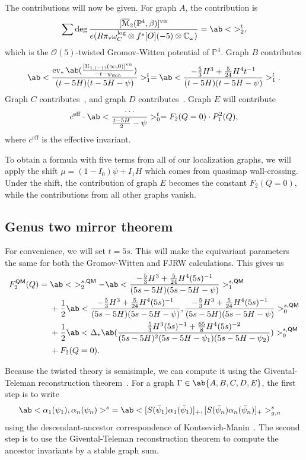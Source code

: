 \documentclass[10pt,oldfontcommands,oneside]{memoir}
\theoremstyle{definition}
\theoremstyle{remark}
\theoremstyle{plain}
\theoremstyle{definition}
\theoremstyle{remark}
\newcommand{\C}{\mathbb{C}}
\renewcommand{\P}{\mathbb{P}}
\newcommand{\Mbar}{\overline{\mathcal{M}}}
\newcommand{\mc}[1]{\mathcal{#1}}
\newcommand{\mr}[1]{\mathrm{#1}}
\newcommand{\ms}[1]{\mathsf{#1}}
\newcommand{\1}{\mathbf{1}}
\newcommand{\2}{\mathbf{2}}
\newcommand{\3}{\mathbf{3}}
\newcommand{\vir}{\mr{vir}}
\newcommand{\QM}{\ms{QM}}
\DeclareMathOperator{\ev}{ev}
\begin{document}
The contributions will now be given. For graph $A$, the contribution is
\begin{align*}
    \sum \deg \frac{[\Mbar_2(\P^4, \beta)]^{\vir}}{e(R\pi_* \omega_C^{\log} \otimes f^* \mc[O](-5) \otimes \C_{\omega})} = \ab<\ >_2^t,
\end{align*}
which is the $\mc{O}(5)$-twisted Gromov-Witten potential of $\P^4$. Graph $B$ contributes
\[ \ab<\frac{\ev_* \ab(\frac{[\mc{U}_{1,(-1)}(\infty,0)]^{\vir}}{-t-\psi_{\min}})}{(t-5H)(t-5H-\psi)}>_1^{t} =  \ab< \frac{-\frac{5}{3}H^3 + \frac{5}{24}H^4t^{-1}}{(t-5H)(t-5H-\psi)}>_1^{t}. \]
Graph $C$ contributes~, and graph $D$ contributes~. Graph $E$ will contribute
\[ c^{\mr{eff}} \cdot \ab<\frac{\cdots}{\frac{t-5H}{2}-\psi}>_0^{t} = F_2(Q=0) \cdot P_1^2(Q), \]
where $c^{\mr{eff}}$ is the effective invariant.


To obtain a formula with five terms from all of our localization graphs, we will apply the shift $\mu = (1-I_0)\psi + I_1 H$ which comes from quasimap wall-crossing. Under the shift, the contribution of graph $E$ becomes the constant $F_2(Q=0)$, while the contributions from all other graphs vanish.

\subsection{Genus two mirror theorem}%
\label{sub:Genus two mirror theorem}

For convenience, we will set $t = 5s$. This will make the equivariant parameters the same for both the Gromov-Witten and FJRW calculations. This gives us
\begin{align*}
    F_2^{\QM}(Q) ={}& \ab<\ >_2^{s,\QM} - \ab< \frac{-\frac{5}{3}H^3 + \frac{5}{24}H^4(5s)^{-1}}{(5s-5H)(5s-5H-\psi)}>_1^{s,\QM} \\
    &+ \frac{1}{2} \ab<\frac{-\frac{5}{3}H^3 + \frac{5}{24}H^4 (5s)^{-1}}{(5s-5H)(5s-5H-\psi)}, \frac{-\frac{5}{3}H^3 + \frac{5}{24}H^4 (5s)^{-1}}{(5s-5H)(5s-5H-\psi)}>_0^{s,\QM}  \\
    &+ \frac{1}{2} \ab<\Delta_* \ab(\frac{\frac{5}{3} H^3 (5s)^{-1}+ \frac{65}{8}H^4 (5s)^{-2}}{(5s-5H)^2(5s-5H-\psi_1)(5s-5H-\psi_2)})>_0^{s,\QM}  \\
    &+ F_2(Q=0).
\end{align*}

Because the twisted theory is semisimple, we can compute it using the Givental-Teleman reconstruction theorem~\cite{ssfrobhg,2dsscohft}. For a graph $\Gamma \in \ab\{A,B,C,D,E\}$, the first step is to write
\begin{align*}
    \ab<\alpha_1(\psi_1), \alpha_n(\psi_n)>^s &= \ab<[ S(\bar{\psi}_1)\alpha_1(\bar{\psi}_1 )]_+, [S(\bar{\psi}_n) \alpha_n(\bar{\psi}_n)]_+>_{g,n}^s
\end{align*}
using the descendant-ancestor correspondence of Kontsevich-Manin~\cite{descancestor}.
The second step is to use the Givental-Teleman reconstruction theorem to compute the ancestor invariants by a stable graph sum.
\end{document}
